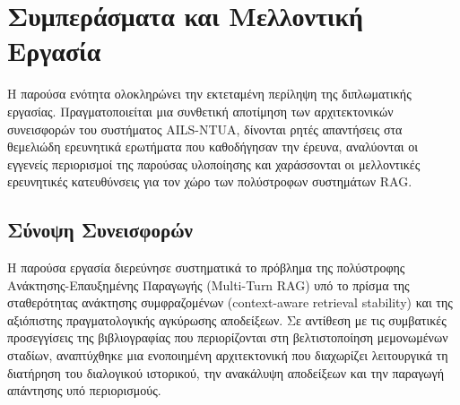 \section{Συμπεράσματα και Μελλοντική Εργασία}

Η παρούσα ενότητα ολοκληρώνει την εκτεταμένη περίληψη της διπλωματικής εργασίας. Πραγματοποιείται μια συνθετική αποτίμηση των αρχιτεκτονικών συνεισφορών του συστήματος AILS-NTUA, δίνονται ρητές απαντήσεις στα θεμελιώδη ερευνητικά ερωτήματα που καθοδήγησαν την έρευνα, αναλύονται οι εγγενείς περιορισμοί της παρούσας υλοποίησης και χαράσσονται οι μελλοντικές ερευνητικές κατευθύνσεις για τον χώρο των πολύστροφων συστημάτων RAG.

\subsection{Σύνοψη Συνεισφορών}

Η παρούσα εργασία διερεύνησε συστηματικά το πρόβλημα της πολύστροφης Ανάκτησης-Επαυξημένης Παραγωγής (Multi-Turn RAG) υπό το πρίσμα της σταθερότητας ανάκτησης συμφραζομένων (context-aware retrieval stability) και της αξιόπιστης πραγματολογικής αγκύρωσης αποδείξεων. Σε αντίθεση με τις συμβατικές προσεγγίσεις της βιβλιογραφίας που περιορίζονται στη βελτιστοποίηση μεμονωμένων σταδίων, αναπτύχθηκε μια ενοποιημένη αρχιτεκτονική που διαχωρίζει λειτουργικά τη διατήρηση του διαλογικού ιστορικού, την ανακάλυψη αποδείξεων και την παραγωγή απάντησης υπό περιορισμούς.

